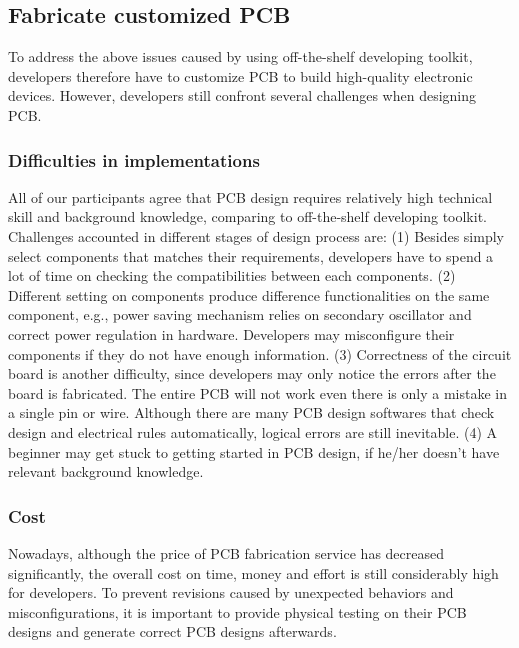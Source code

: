 \subsection{Fabricate customized PCB}
To address the above issues caused by using off-the-shelf developing toolkit, developers therefore have to customize PCB to build high-quality electronic devices.
However, developers still confront several challenges when designing PCB.

\subsubsection{Difficulties in implementations}
All of our participants agree that PCB design requires relatively high technical skill and background knowledge, comparing to off-the-shelf developing toolkit.
Challenges accounted in different stages of design process are:
(1) Besides simply select components that matches their requirements, developers have to spend a lot of time on checking the compatibilities between each components.
(2) Different setting on components produce difference functionalities on the same component, e.g., power saving mechanism relies on secondary oscillator and correct power regulation in hardware.
Developers may misconfigure their components if they do not have enough information.
(3) Correctness of the circuit board is another difficulty, since developers may only notice the errors after the board is fabricated.
The entire PCB will not work even there is only a mistake in a single pin or wire.
Although there are many PCB design softwares that check design and electrical rules automatically, logical errors are still inevitable.
(4) A beginner may get stuck to getting started in PCB design, if he/her doesn't have relevant background knowledge.

\subsubsection{Cost}
Nowadays, although the price of PCB fabrication service has decreased significantly, the overall cost on time, money and effort is still considerably high for developers.
To prevent revisions caused by unexpected behaviors and misconfigurations, it is important to provide physical testing on their PCB designs and generate correct PCB designs afterwards. %


